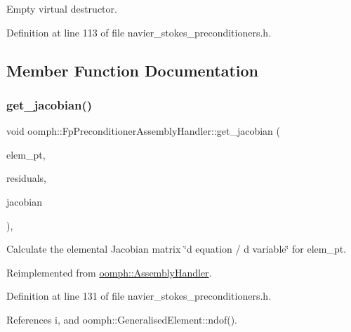 Empty virtual destructor. 



Definition at line 113 of file navier\+\_\+stokes\+\_\+preconditioners.\+h.



\subsection{Member Function Documentation}
\mbox{\label{classoomph_1_1FpPreconditionerAssemblyHandler_a6360dd27d3530576487cb7e239dfe17e}} 
\subsubsection{\texorpdfstring{get\+\_\+jacobian()}{get\_jacobian()}}
{\footnotesize\ttfamily void oomph\+::\+Fp\+Preconditioner\+Assembly\+Handler\+::get\+\_\+jacobian (\begin{DoxyParamCaption}\item[{\hyperlink{classoomph_1_1GeneralisedElement}{Generalised\+Element} $\ast$const \&}]{elem\+\_\+pt,  }\item[{\hyperlink{classoomph_1_1Vector}{Vector}$<$ double $>$ \&}]{residuals,  }\item[{\hyperlink{classoomph_1_1DenseMatrix}{Dense\+Matrix}$<$ double $>$ \&}]{jacobian }\end{DoxyParamCaption})\hspace{0.3cm}{\ttfamily [inline]}, {\ttfamily [virtual]}}



Calculate the elemental Jacobian matrix \char`\"{}d equation 
/ d variable\char`\"{} for elem\+\_\+pt. 



Reimplemented from \hyperlink{classoomph_1_1AssemblyHandler_ad43c3d8760be0ba6ebee8d82509458e5}{oomph\+::\+Assembly\+Handler}.



Definition at line 131 of file navier\+\_\+stokes\+\_\+preconditioners.\+h.



References i, and oomph\+::\+Generalised\+Element\+::ndof().

